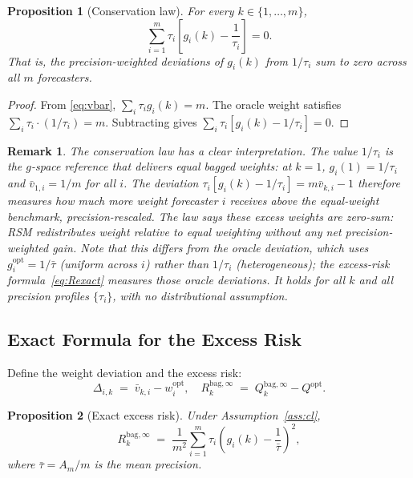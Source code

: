 \documentclass[12pt,a4paper]{article}
\newtheorem{proposition}{Proposition}
\newtheorem{remark}{Remark}
\theoremstyle{definition}
\newcommand{\Qopt}{Q^{\mathrm{opt}}}
\newcommand{\Qbag}{Q_k^{\mathrm{bag},\infty}}
\newcommand{\Rk}{R_k^{\mathrm{bag},\infty}}
\begin{document}
\begin{proposition}[Conservation law]\label{prop:conservation}
For every $k\in\{1,\ldots,m\}$,
\begin{equation}\label{eq:conservation}
  \sum_{i=1}^m \tau_i\!\left[g_i(k)-\frac{1}{\tau_i}\right]=0.
\end{equation}
That is, the precision-weighted deviations of $g_i(k)$ from $1/\tau_i$ sum
to zero across all $m$ forecasters.
\end{proposition}

\begin{proof}
From \eqref{eq:vbar}, $\sum_i\tau_i g_i(k)=m$.  The oracle weight satisfies
$\sum_i\tau_i\cdot(1/\tau_i)=m$.  Subtracting gives
$\sum_i\tau_i[g_i(k)-1/\tau_i]=0$.
\end{proof}

\begin{remark}
The conservation law has a clear interpretation.  The value $1/\tau_i$ is
the $g$-space reference that delivers equal bagged weights: at $k=1$,
$g_i(1)=1/\tau_i$ and $\bar v_{1,i}=1/m$ for all $i$.  The deviation
$\tau_i[g_i(k)-1/\tau_i] = m\bar v_{k,i}-1$ therefore measures how much
more weight forecaster $i$ receives above the equal-weight benchmark,
precision-rescaled.  The law says these excess weights are zero-sum:
RSM redistributes weight relative to equal weighting without any net
precision-weighted gain.  Note that this differs from the oracle deviation,
which uses $g_i^{\mathrm{opt}}=1/\bar\tau$ (uniform across $i$) rather
than $1/\tau_i$ (heterogeneous); the excess-risk formula~\eqref{eq:Rexact}
measures those oracle deviations.  It holds for all $k$ and all precision
profiles $\{\tau_i\}$, with no distributional assumption.
\end{remark}

\subsection{Exact Formula for the Excess Risk}

Define the weight deviation and the excess risk:
\begin{equation}
  \Delta_{i,k} \;=\; \bar v_{k,i} - w_i^{\mathrm{opt}},\quad
  \Rk \;=\; \Qbag - \Qopt.
\end{equation}

\begin{proposition}[Exact excess risk]\label{prop:exactR}
Under Assumption~\ref{ass:cl},
\begin{equation}\label{eq:Rexact}
  \Rk \;=\; \frac{1}{m^2}\sum_{i=1}^m \tau_i\!\left(g_i(k)-\frac{1}{\bar\tau}\right)^{\!2},
\end{equation}
where $\bar\tau = A_m/m$ is the mean precision.
\end{proposition}
\end{document}
